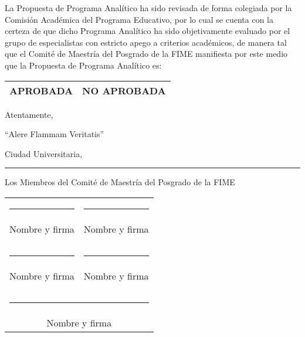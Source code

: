 \documentclass{article}
\renewcommand{\arraystretch}{2.0}
\begin{document}
\newpage

La Propuesta de Programa Anal\'{i}tico ha sido revisada de forma colegiada por la Comisi\'{o}n Acad\'{e}mica del
Programa Educativo, por lo cual se cuenta con la certeza de que dicho Programa Anal\'{i}tico ha sido
objetivamente evaluado por el grupo de especialistas con estricto apego a criterios acad\'{e}micos, de manera
tal que el Comit\'{e} de Maestr\'{i}a del Posgrado de la FIME manifiesta por este medio que la Propuesta de
Programa Anal\'{i}tico es:

\label{lastpage}

\begin{center}
  
\begin{tabular}{|c|c|}
    \hline 
    APROBADA & NO APROBADA \\
    \hline
\end{tabular}

\quad

  Atentamente,

  ``Alere Flammam Veritatis''

  \quad
  
  Ciudad Universitaria, \rule{5cm}{1pt}

  \quad
  
  Los Miembros del Comit\'{e} de Maestr\'{i}a del Posgrado de la FIME

  \vspace*{2cm}
  
  \renewcommand{\arraystretch}{1.0}  
  \begin{tabular}{cc}
\rule{5cm}{1pt} & \rule{5cm}{1pt} \\
    Nombre y firma
    &  Nombre y firma \\
    \phantom{xxx} & \phantom{xxx} \\
        \phantom{xxx} & \phantom{xxx} \\
    \rule{5cm}{1pt} & \rule{5cm}{1pt} \\
     Nombre y firma
     &  Nombre y firma \\
     \phantom{xxx} & \phantom{xxx} \\
     \phantom{xxx} & \phantom{xxx} \\     
    \multicolumn{2}{c}{\rule{5cm}{1pt}} \\
\multicolumn{2}{c}{Nombre y firma}
  \end{tabular}

  

\end{center}
\end{document}
